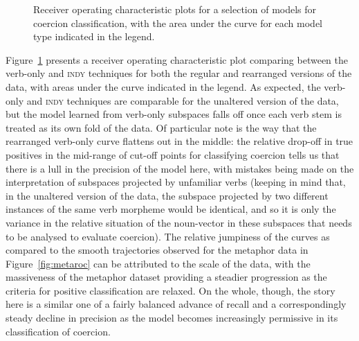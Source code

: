 \begin{figure}
\caption[Receiver Operating Characterisation for Coercion Classification]{Receiver operating characteristic plots for a selection of models for coercion classification, with the area under the curve for each model type indicated in the legend.}
\label{fig:coerroc}
\end{figure}

Figure~\ref{fig:coerroc} presents a receiver operating characteristic plot comparing between the verb-only and \textsc{indy} techniques for both the regular and rearranged versions of the data, with areas under the curve indicated in the legend.  As expected, the verb-only and \textsc{indy} techniques are comparable for the unaltered version of the data, but the model learned from verb-only subspaces falls off once each verb stem is treated as its own fold of the data.  Of particular note is the way that the rearranged verb-only curve flattens out in the middle: the relative drop-off in true positives in the mid-range of cut-off points for classifying coercion tells us that there is a lull in the precision of the model here, with mistakes being made on the interpretation of subspaces projected by unfamiliar verbs (keeping in mind that, in the unaltered version of the data, the subspace projected by two different instances of the same verb morpheme would be identical, and so it is only the variance in the relative situation of the noun-vector in these subspaces that needs to be analysed to evaluate coercion).  The relative jumpiness of the curves as compared to the smooth trajectories observed for the metaphor data in Figure~\ref{fig:metaroc} can be attributed to the scale of the data, with the massiveness of the metaphor dataset providing a steadier progression as the criteria for positive classification are relaxed.  On the whole, though, the story here is a similar one of a fairly balanced advance of recall and a correspondingly steady decline in precision as the model becomes increasingly permissive in its classification of coercion.

